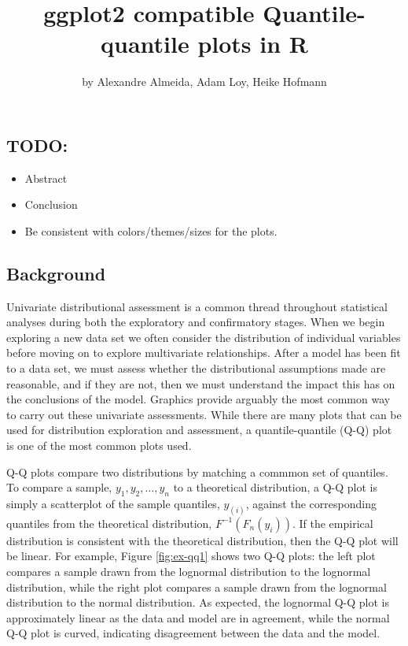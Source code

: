 \title{ggplot2 compatible Quantile-quantile plots in R}
\author{by Alexandre Almeida, Adam Loy, Heike Hofmann}

\maketitle


\newcommand{\hh}[1]{{\textcolor{orange}{#1}}}
\newcommand{\al}[1]{{\textcolor{violet}{#1}}}
\newcommand{\alex}[1]{{\textcolor{green}{#1}}}

\subsection{TODO:}\label{todo}

\begin{itemize}
\item
  Abstract
\item
  Conclusion
\item
  Be consistent with colors/themes/sizes for the plots.
\end{itemize}

\subsection{Background}\label{background}

\label{sec:background}

Univariate distributional assessment is a common thread throughout
statistical analyses during both the exploratory and confirmatory
stages. When we begin exploring a new data set we often consider the
distribution of individual variables before moving on to explore
multivariate relationships. After a model has been fit to a data set, we
must assess whether the distributional assumptions made are reasonable,
and if they are not, then we must understand the impact this has on the
conclusions of the model. Graphics provide arguably the most common way
to carry out these univariate assessments. While there are many plots
that can be used for distribution exploration and assessment, a
quantile-quantile (Q-Q) plot \citep{Wilk1968-ii} is one of the most
common plots used.

Q-Q plots compare two distributions by matching a commmon set of
quantiles. To compare a sample, \(y_1, y_2, \ldots, y_n\) to a
theoretical distribution, a Q-Q plot is simply a scatterplot of the
sample quantiles, \(y_{(i)}\), against the corresponding quantiles from
the theoretical distribution, \(F^{-1}\left( F_n(y_i) \right)\). If the
empirical distribution is consistent with the theoretical distribution,
then the Q-Q plot will be linear. For example, Figure \ref{fig:ex-qq1}
shows two Q-Q plots: the left plot compares a sample drawn from the
lognormal distribution to the lognormal distribution, while the right
plot compares a sample drawn from the lognormal distribution to the
normal distribution. As expected, the lognormal Q-Q plot is
approximately linear as the data and model are in agreement, while the
normal Q-Q plot is curved, indicating disagreement between the data and
the model.

